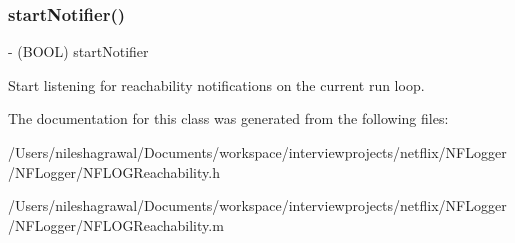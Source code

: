 \subsubsection{\texorpdfstring{start\+Notifier()}{startNotifier()}}
{\footnotesize\ttfamily -\/ (B\+O\+OL) start\+Notifier \begin{DoxyParamCaption}{ }\end{DoxyParamCaption}}

Start listening for reachability notifications on the current run loop. 

The documentation for this class was generated from the following files\+:\begin{DoxyCompactItemize}
\item 
/\+Users/nileshagrawal/\+Documents/workspace/interviewprojects/netflix/\+N\+F\+Logger/\+N\+F\+Logger/N\+F\+L\+O\+G\+Reachability.\+h\item 
/\+Users/nileshagrawal/\+Documents/workspace/interviewprojects/netflix/\+N\+F\+Logger/\+N\+F\+Logger/N\+F\+L\+O\+G\+Reachability.\+m\end{DoxyCompactItemize}
